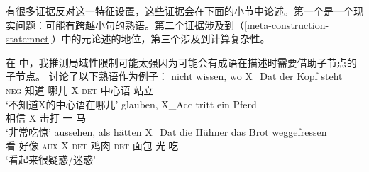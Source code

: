 有很多证据反对这一特征设置，这些证据会在下面的小节中论述。第一个是一个现实问题：可能有跨越小句的熟语。第二个证据涉及到（\ref{meta-construction-statemnet}）中的元论述的地位，第三个涉及到计算复杂性。


在 中，我推测局域性限制可能太强因为可能会有成语在描述时需要借助子节点的子节点。 讨论了以下熟语作为例子：
\eal
\label{ex-idiom-non-nominative-external}
\ex 
\gll nicht wissen, wo    X\_Dat der Kopf steht\\
     \textsc{neg}   知道   哪儿 X   \textsc{det} 中心语 站立\\
\glt `不知道X的中心语在哪儿'
\ex\label{mich-tritt-ein-Pferd}
\gll glauben, X\_Acc tritt ein Pferd\\
     相信  X     击打 一 马\\
\glt `非常吃惊'
\ex 
\gll aussehen, als hätten X\_Dat die Hühner das Brot weggefressen\\
	 看 好像 \textsc{aux} X   \textsc{det} 鸡肉  \textsc{det} 面包 光.吃\\
\glt `看起来很疑惑/迷惑'
\ex
\label{ex-look-as-if-butter}


